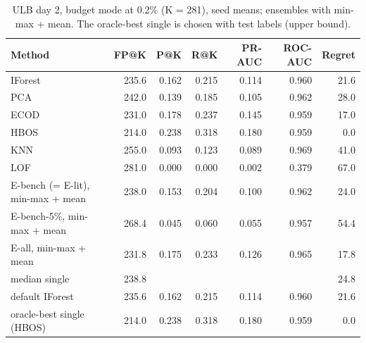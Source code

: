 \begin{table}[t]
\centering
\small
\caption{ULB day 2, budget mode at 0.2\% (K = 281), seed means; ensembles with min-max + mean. The oracle-best single is chosen with test labels (upper bound).}
\label{tab:e3-ulb-budget}
\begin{tabular}{lrrrrrr}
\toprule
Method & FP@K & P@K & R@K & PR-AUC & ROC-AUC & Regret \\
\midrule
IForest & 235.6 & 0.162 & 0.215 & 0.114 & 0.960 & 21.6 \\
PCA & 242.0 & 0.139 & 0.185 & 0.105 & 0.962 & 28.0 \\
ECOD & 231.0 & 0.178 & 0.237 & 0.145 & 0.959 & 17.0 \\
HBOS & 214.0 & 0.238 & 0.318 & 0.180 & 0.959 & 0.0 \\
KNN & 255.0 & 0.093 & 0.123 & 0.089 & 0.969 & 41.0 \\
LOF & 281.0 & 0.000 & 0.000 & 0.002 & 0.379 & 67.0 \\
E-bench (= E-lit), min-max + mean & 238.0 & 0.153 & 0.204 & 0.100 & 0.962 & 24.0 \\
E-bench-5\%, min-max + mean & 268.4 & 0.045 & 0.060 & 0.055 & 0.957 & 54.4 \\
E-all, min-max + mean & 231.8 & 0.175 & 0.233 & 0.126 & 0.965 & 17.8 \\
median single & 238.8 &  &  &  &  & 24.8 \\
default IForest & 235.6 & 0.162 & 0.215 & 0.114 & 0.960 & 21.6 \\
oracle-best single (HBOS) & 214.0 & 0.238 & 0.318 & 0.180 & 0.959 & 0.0 \\
\bottomrule
\end{tabular}
\end{table}

